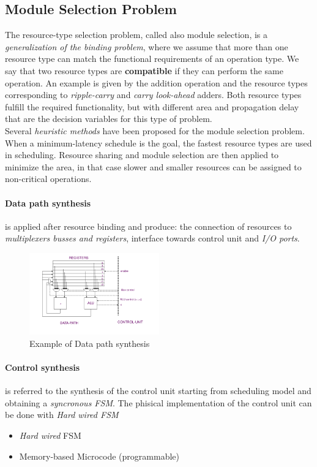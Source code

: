 \subsection{Module Selection Problem}
The resource-type selection problem, called also module selection, is a \textit{generalization of the binding problem}, where we assume that more than one resource type can match the functional requirements of an operation type. We say that two resource types are \textbf{compatible} if they can perform the same operation. An example is given by the addition operation and the resource types corresponding to \textit{ripple-carry} and \textit{carry look-ahead} adders. Both resource types fulfill the required functionality, but with different area and propagation delay that are the decision variables for this type of problem.
\bigskip\\
Several \textit{heuristic methods} have been proposed for the module selection problem. When a minimum-latency schedule is the goal, the fastest resource types are used in scheduling. Resource sharing and module selection are then applied to minimize the area, in that case slower and smaller resources can be assigned to non-critical operations.

\paragraph{Data path synthesis}
is applied after resource binding and produce: the connection of resources to \textit{multiplexers busses and registers}, interface towards control unit and \textit{I/O ports}.

\begin{figure}[H]
	\centering
	\includegraphics[width=0.50\textwidth]{./Cap5/Images/Image15.png}
	\caption{Example of Data path synthesis}
	\label{fig:dpsynth}
\end{figure}

\paragraph{Control synthesis}
is referred to the synthesis of the control unit starting from scheduling model and obtaining a \textit{syncronous FSM}. The phisical implementation of the control unit can be done with \textit{Hard wired FSM} 
\begin{itemize}
	\item \textit{Hard wired} FSM 
	\item Memory-based Microcode (programmable)
\end{itemize} 

